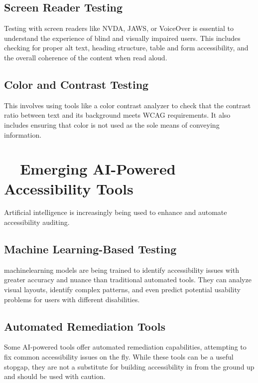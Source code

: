 \subsection{Screen Reader Testing}
\label{subsec:screen-reader-testing}
Testing with screen readers like NVDA, JAWS, or VoiceOver is essential to understand the experience of blind and visually impaired users. This includes checking for proper alt text, heading structure, table and form accessibility, and the overall coherence of the content when read aloud.
\supercite{WebAIM2023, WebAIMSurvey}

\subsection{Color and Contrast Testing}
\label{subsec:color-contrast-testing}
This involves using tools like a color contrast analyzer to check that the contrast ratio between text and its background meets WCAG requirements. It also includes ensuring that color is not used as the sole means of conveying information.
\supercite{WebAIMContrastChecker, WCAGContrast2018}

\section{~~Emerging AI-Powered Accessibility Tools}
\label{sec:ai-tools}
Artificial intelligence is increasingly being used to enhance and automate accessibility auditing.

\subsection{Machine Learning-Based Testing}
\label{subsec:ml-testing}
\gls{machinelearning} models are being trained to identify accessibility issues with greater accuracy and nuance than traditional automated tools. They can analyze visual layouts, identify complex patterns, and even predict potential usability problems for users with different disabilities.
\supercite{Evinced, Stark2024}

\subsection{Automated Remediation Tools}
\label{subsec:automated-remediation}
Some AI-powered tools offer automated remediation capabilities, attempting to fix common accessibility issues on the fly. While these tools can be a useful stopgap, they are not a substitute for building accessibility in from the ground up and should be used with caution.
\supercite{AccessiBe, UserWay2024}

